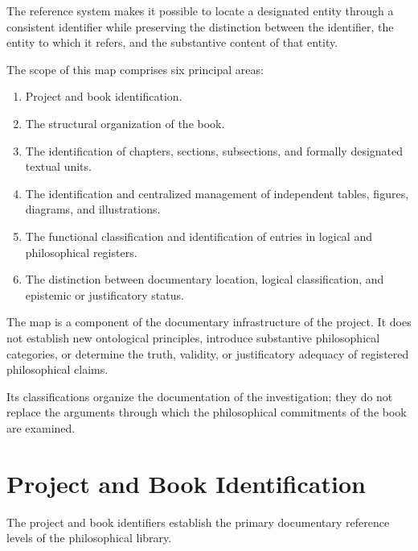 The reference system makes it possible to locate a designated
entity through a consistent identifier while preserving the
distinction between the identifier, the entity to which it refers,
and the substantive content of that entity.

The scope of this map comprises six principal areas:

\begin{enumerate}
    \item Project and book identification.
    \item The structural organization of the book.
    \item The identification of chapters, sections, subsections,
          and formally designated textual units.
    \item The identification and centralized management of
          independent tables, figures, diagrams, and illustrations.
    \item The functional classification and identification of
          entries in logical and philosophical registers.
    \item The distinction between documentary location, logical
          classification, and epistemic or justificatory status.
\end{enumerate}

The map is a component of the documentary infrastructure of
the project. It does not establish new ontological principles,
introduce substantive philosophical categories, or determine
the truth, validity, or justificatory adequacy of registered
philosophical claims.

Its classifications organize the documentation of the
investigation; they do not replace the arguments through which
the philosophical commitments of the book are examined.



\section*{Project and Book Identification}

The project and book identifiers establish the primary
documentary reference levels of the philosophical library.

